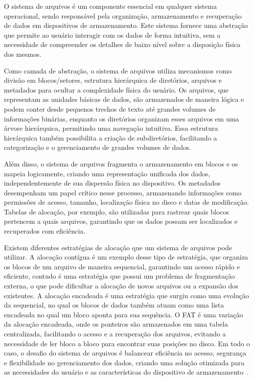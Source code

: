 \documentclass[
    12pt,				%
    oneside,   	        %
    a4paper,			%
    english,			%
    french,				%
    spanish,			%
    brazil,				%
    ]{pacotes/abntex2}
\begin{document}
O sistema de arquivos é um componente essencial em qualquer sistema operacional, sendo responsável pela organização, armazenamento e recuperação de dados em dispositivos de armazenamento. Este sistema fornece uma abstração que permite ao usuário interagir com os dados de forma intuitiva, sem a necessidade de compreender os detalhes de baixo nível sobre a disposição física dos mesmos.

Como camada de abstração, o sistema de arquivos utiliza mecanismos como divisão em blocos/setores, estrutura hierárquica de diretórios, arquivos e metadados para ocultar a complexidade física do usuário. Os arquivos, que representam as unidades básicas de dados, são armazenados de maneira lógica e podem conter desde pequenos trechos de texto até grandes volumes de informações binárias, enquanto os diretórios organizam esses arquivos em uma árvore hierárquica, permitindo uma navegação intuitiva. Essa estrutura hierárquica também possibilita a criação de subdiretórios, facilitando a categorização e o gerenciamento de grandes volumes de dados.

Além disso, o sistema de arquivos fragmenta o armazenamento em blocos e os mapeia logicamente, criando uma representação unificada dos dados, independentemente de sua dispersão física no dispositivo. Os metadados desempenham um papel crítico nesse processo, armazenando informações como permissões de acesso, tamanho, localização física no disco e datas de modificação. Tabelas de alocação, por exemplo, são utilizadas para rastrear quais blocos pertencem a quais arquivos, garantindo que os dados possam ser localizados e recuperados com eficiência.

Existem diferentes estratégias de alocação que um sistema de arquivos pode utilizar. A alocação contígua é um exemplo desse tipo de estratégia, que organiza os blocos de um arquivo de maneira sequencial, garantindo um acesso rápido e eficiente, contudo é uma estratégia que possui um problema de fragmentação externa, o que pode dificultar a alocação de novos arquivos ou a expansão dos existentes. A alocação encadeada é uma estratégia que surgiu como uma evolução da sequencial, no qual os blocos de dados também atuam como uma lista encadeada no qual um bloco aponta para sua sequência. O FAT é uma variação da alocação encadeada, onde os ponteiros são armazenados em uma tabela centralizada, facilitando o acesso e a recuperação dos arquivos, evitando a necessidade de ler bloco a bloco para encontrar suas posições no disco. Em todo o caso, o desafio do sistema de arquivos é balancear eficiência no acesso, segurança e flexibilidade no gerenciamento dos dados, criando uma solução otimizada para as necessidades do usuário e as características do dispositivo de armazenamento~\cite{maziero2019}.
\end{document}
